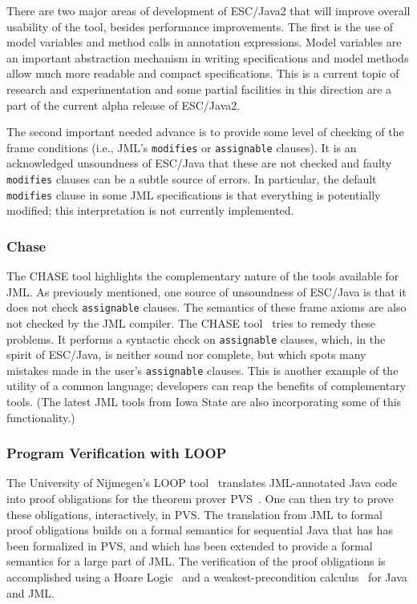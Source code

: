 There are two major areas of development of ESC/\-Java2 that will
improve overall usability of the tool, besides performance
improvements.  The first is the use of model variables and method
calls in annotation expressions.  Model variables are an important
abstraction mechanism in writing specifications and model methods
allow much more readable and compact specifications.  This is a
current topic of research and experimentation and some partial
facilities in this direction are a part of the current alpha release
of ESC/Java2.

The second important needed advance is to provide some level of
checking of the frame conditions (i.e., JML's \texttt{modifies} or
\texttt{assignable} clauses).  It is an acknowledged unsoundness of
ESC/Java that these are not checked and faulty \texttt{modifies}
clauses can be a subtle source of errors.  In particular, the default
\texttt{modifies} clause in some JML specifications is that everything
is potentially modified; this interpretation is not currently
implemented.

\subsubsection{Chase}
\label{Chase}

The CHASE tool highlights the complementary nature of the tools
available for JML.  As previously mentioned, one source of unsoundness
of ESC/Java is that it does not check {\tt assignable} clauses.  The
semantics of these frame axioms are also not checked by the JML
compiler.  The CHASE tool~\cite{CH03} tries to remedy these problems.
It performs a syntactic check on {\tt assignable} clauses, which, in
the spirit of ESC/Java, is neither sound nor complete, but which spots
many mistakes made in the user's {\tt assignable} clauses.  This is another
example of the utility of a common language; developers can reap the
benefits of complementary tools.
(The latest JML tools from Iowa State are also incorporating some of this
functionality.) 

\subsubsection{Program Verification with LOOP}
\label{loop}

The University of Nijmegen's LOOP tool~\cite{Jacobs-etal98,Huisman01}
translates JML-annotated Java code into proof obligations for the
theorem prover PVS~\cite{OwreRRSS96}.  One can then try to prove these
obligations, interactively, in PVS\@.  The translation from JML to
formal proof obligations builds on a formal semantics for sequential
Java that has has been formalized in PVS, and which has been extended
to provide a formal semantics for a large part of JML\@.  The
verification of the proof obligations is accomplished using a Hoare
Logic~\cite{JacobsPoll01a} and a weakest-precondition
calculus~\cite{Jacobs03} for Java and JML\@.

